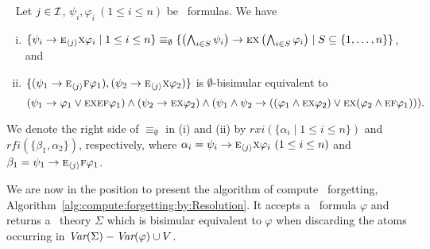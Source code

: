 \documentclass[twoside,11pt]{article}
\begin{document}
\begin{lemma}~\label{lem:In2NI}
 Let $j\in {\cal I}$, $\psi_i,\varphi_i~(1\le i\le n)$ be \CTL\ formulas. We have
 \begin{enumerate}[(i)]
	 \item $\{\psi_i\rightarrow \textsc{e}_{{\langle{j}\rangle}} \textsc{x} \varphi_i \mid 1\le i\le n\}\equiv_\emptyset
        \{\left(\bigwedge_{i\in S}\psi_i\right)\rightarrow \textsc{e} \textsc{x} \left(\bigwedge_{i\in S}\varphi_i\right)\mid S\subseteq\{1,\dots, n\}\}$, and

 	 \item $\{(\psi_1 \rightarrow \textsc{e}_{{\langle{j}\rangle}}\textsc{f} \varphi_1), (\psi_2 \rightarrow \textsc{e}_{{\langle{j}\rangle}}\textsc{x} \varphi_2)\}$
    is $\emptyset$-bisimular equivalent to %
    \begin{equation}
    (\psi_1 \rightarrow \varphi_1 \vee \textsc{e} \textsc{x} \textsc{e} \textsc{f} \varphi_1)
    \wedge (\psi_2 \rightarrow \textsc{e} \textsc{x} \varphi_2)
    \wedge (\psi_1 \wedge \psi_2 \rightarrow ((\varphi_1 \wedge \textsc{e} \textsc{x} \varphi_2) \vee \textsc{e} \textsc{x} (\varphi_2 \wedge \textsc{e} \textsc{f} \varphi_1))).
    \end{equation}
 \end{enumerate}
 \end{lemma}
  We denote the right side of $\equiv_\emptyset$ in (i) and (ii) by
  $rxi(\{\alpha_i\mid 1\le i\le n\})$ and $rfi(\{\beta_1,\alpha_2\})$, respectively, where
$\alpha_i=\psi_i\rightarrow \textsc{e}_{{\langle{j}\rangle}} \textsc{x} \varphi_i~(1\le i\le n)$ and $\beta_1=\psi_1 \rightarrow \textsc{e}_{{\langle{j}\rangle}}\textsc{f} \varphi_1$.


We are now in the position to present the algorithm of compute \CTL\ forgetting,  Algorithm~\ref{alg:compute:forgetting:by:Resolution}.
It accepts a \CTL\ formula $\varphi$ and returns a \CTL\ theory $\Sigma$ which is bisimular equivalent to $\varphi$ when discarding the atoms 
occurring in  $\textit{Var}(\Sigma)-\textit{Var}(\varphi)\cup V$.
%
\end{document}
